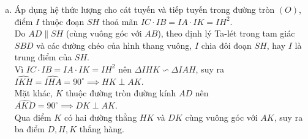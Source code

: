 \begin{bt}
{\begin{enumerate}[a)]
	$$ SC \cdot SD = SA^2. $$
	Trong tam giác vuông $SAO$ vuông tại $A$ có đường cao $AH \perp SO$, ta có:
	$$ SH \cdot SO = SA^2 \implies SC \cdot SD = SH \cdot SO \implies \dfrac{SC}{SO} = \dfrac{SH}{SD}. $$
	Suy ra hai tam giác $\Delta SCH$ và $\Delta SOD$ đồng dạng (c-g-c) $\implies \widehat{SCH} = \widehat{SOD}$.\\
	Do tứ giác $AHCS$ nội tiếp nên góc $\widehat{SCH} = \widehat{SAH}$. Từ các tam giác vuông đồng dạng và cát tuyến $IBC$ cắt $SH$, ta chứng minh được $\Delta ICH \backsim \Delta IHB$ (g-g), suy ra:
	$$ \dfrac{IC}{IH} = \dfrac{IH}{IB} \implies IC \cdot IB = IH^2. $$
	\item Áp dụng hệ thức lượng cho cát tuyến và tiếp tuyến trong đường tròn $(O)$, điểm $I$ thuộc đoạn $SH$ thoả mãn $IC \cdot IB = IA \cdot IK = IH^2$.\\
	Do $AD \parallel SH$ (cùng vuông góc với $AB$), theo định lý Ta-lét trong tam giác $SBD$ và các đường chéo của hình thang vuông, $I$ chia đôi đoạn $SH$, hay $I$ là trung điểm của $SH$.\\
	Vì $IC \cdot IB = IA \cdot IK = IH^2$ nên $\Delta IHK \backsim \Delta IAH$, suy ra $\widehat{IKH} = \widehat{IHA} = 90^\circ \implies HK \perp AK$.\\
	Mặt khác, $K$ thuộc đường tròn đường kính $AD$ nên $\widehat{AKD} = 90^\circ \implies DK \perp AK$.\\
	Qua điểm $K$ có hai đường thẳng $HK$ và $DK$ cùng vuông góc với $AK$, suy ra ba điểm $D, H, K$ thẳng hàng.
\end{enumerate}
}
\end{bt}

